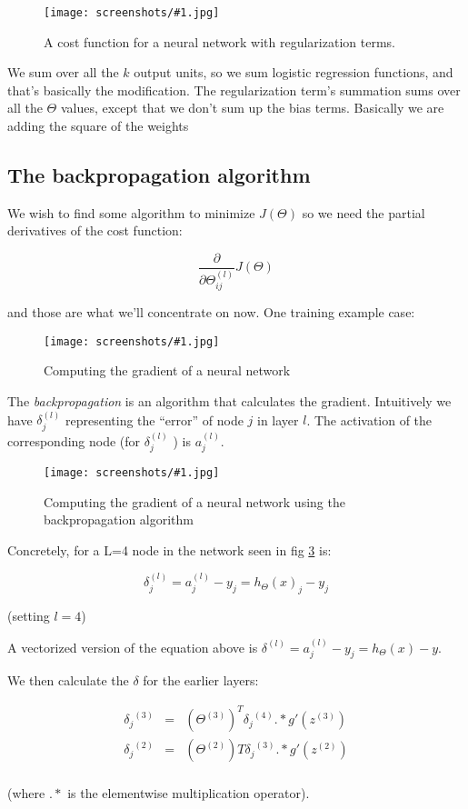 \documentclass[a4, 12pt, english, USenglish]{scrreprt}
\newcommand{\screenshot}[2]{
\begin{figure}[htb]
\texttt{[image: screenshots/\#1.jpg]}
\label{#1}
\caption{#2}
\end{figure}}
\newcommand{\mXXX}[1]{\marginpar{\tiny{\bf Rmz:} {\it #1}}}
\newcommand{\idx}[1]{{\em #1}\index{#1}}
\begin{document}
\screenshot{actualNNcostfunction}{A cost function for a neural network
with regularization terms.}

We sum over all the \(k\) output units, so we sum logistic regression
functions, and that's basically the modification. The regularization
term's summation sums over all the \(\Theta\) values, except that we
don't sum up the bias terms.  Basically we are adding the square of
the weights \mXXX{right?}

\subsection{The backpropagation algorithm}


We wish to find some algorithm to  minimize \(J(\Theta)\) so we need
the partial derivatives of the cost function:

\[
  \frac{\partial}{\partial{\Theta^{(l)}_{ij}}} J(\Theta)
\]

and those are what we'll concentrate on now.     One training example
case:

\screenshot{NNgradientcomp}{Computing the gradient of a neural network}

The \idx{backpropagation} is an algorithm that calculates the
gradient.   Intuitively we have  \(\delta_j^{(l)}\) representing the
``error'' of node \(j\) in layer \(l\).  The activation of the
corresponding node (for \(\delta_j^{(l)}\) ) is 
\(a_j^{(l)}\).

\screenshot {NNbackprop}{Computing the gradient of  a neural network
  using the backpropagation algorithm}

Concretely, for a L=4 node in the network seen in fig \ref{NNbackprop} is:

\[
\delta_j^{(l)} = a_j^{(l)} - y_j =  h_\Theta(x)_j - y_j 
\]

(setting \(l=4\))

A vectorized version of the equation above is \(\delta^{(l)} =
a_j^{(l)} - y_j =  h_\Theta(x) - y\).

We then calculate the \(\delta\) for the earlier layers:


\[
\begin{array}{lcl}
  {\delta_j}^{(3)} &=& ({\Theta}^{(3)})^T {\delta_j}^{(4)}  .*  g'({z}^{(3)}) \\
  {\delta_j}^{(2)} &=& ({\Theta}^{(2)})T {\delta_j}^{(3)}  .*  g'({z}^{(2)}) \\
\end{array}
\]

(where \(.*\) is the elementwise multiplication operator).
\end{document}
